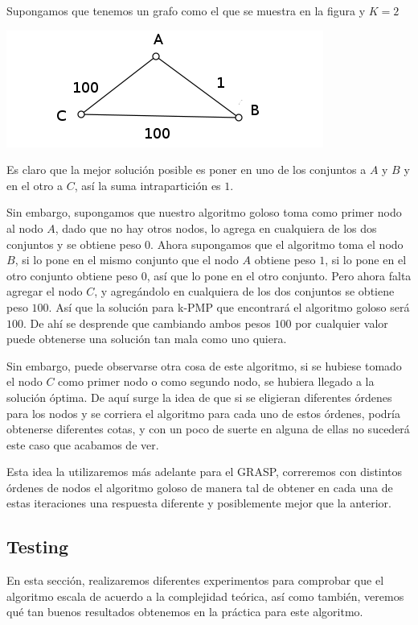 Supongamos que tenemos un grafo como el que se muestra en la figura y $K = 2$

\includegraphics[scale=0.5]{Ej3/grafo.png}

Es claro que la mejor solución posible es poner en uno de los conjuntos a $A$ y $B$ y en el otro a $C$, así la suma intrapartición es $1$.

Sin embargo, supongamos que nuestro algoritmo goloso toma como primer nodo al nodo $A$, dado que no hay otros nodos, lo agrega en cualquiera de los dos conjuntos y se obtiene peso $0$. Ahora supongamos que el algoritmo toma el nodo $B$, si lo pone en el mismo conjunto que el nodo $A$ obtiene peso $1$, si lo pone en el otro conjunto obtiene peso $0$, así que lo pone en el otro conjunto. Pero ahora falta agregar el nodo $C$, y agregándolo en cualquiera de los dos conjuntos se obtiene peso $100$. Así que la solución para k-PMP que encontrará el algoritmo goloso será $100$.
De ahí se desprende que cambiando ambos pesos $100$ por cualquier valor puede obtenerse una solución tan mala como uno quiera.

Sin embargo, puede observarse otra cosa de este algoritmo, si se hubiese tomado el nodo $C$ como primer nodo o como segundo nodo, se hubiera llegado a la solución óptima. De aquí surge la idea de que si se eligieran diferentes órdenes para los nodos y se corriera el algoritmo para cada uno de estos órdenes, podría obtenerse diferentes cotas, y con un poco de suerte en alguna de ellas no sucederá este caso que acabamos de ver.

Esta idea la utilizaremos más adelante para el GRASP, correremos con distintos órdenes de nodos el algoritmo goloso de manera tal de obtener en cada una de estas iteraciones una respuesta diferente y posiblemente mejor que la anterior.

\subsection{Testing}

En esta sección, realizaremos diferentes experimentos para comprobar que el algoritmo escala de acuerdo a la complejidad teórica, así como también, veremos qué tan buenos resultados obtenemos en la práctica para este algoritmo.

